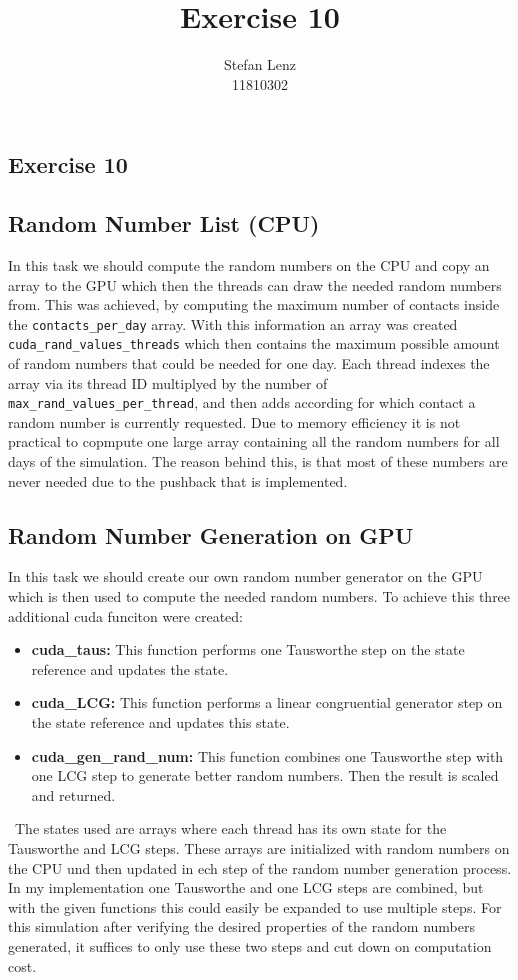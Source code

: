 \documentclass[12pt,a4paper]{article}
\title{Exercise 10}
\author{Stefan Lenz\\11810302}
\date{}
\begin{document}
\begin{center}
  \section*{Exercise 10}
\end{center}
\subsection*{Random Number List (CPU)}
In this task we should compute the random numbers on the CPU and copy an array to the GPU which then the threads can draw the needed random  numbers from. This was achieved, by computing the maximum number of contacts inside the \lstinline|contacts_per_day| array. With this information an array was created \lstinline|cuda_rand_values_threads| which then contains the maximum possible amount of random numbers that could be needed for one day. Each thread indexes the array via its thread ID multiplyed by the number of \lstinline|max_rand_values_per_thread|, and then adds according for which contact a random number is currently requested. Due to memory efficiency it is not practical to copmpute one large array containing all the random numbers for all days of the simulation. The reason behind this, is that most of these numbers are never needed due to the pushback that is implemented.
\subsection*{Random Number Generation on GPU}
In this task we should create our own random number generator on the GPU which is then used to compute the needed random numbers. To achieve this three additional cuda funciton were created:
\begin{itemize}
  \item \textbf{cuda\_taus: } This function performs one Tausworthe step on the state reference and updates the state.
  \item \textbf{cuda\_LCG: } This function performs a linear congruential generator step on the state reference and updates this state.
  \item \textbf{cuda\_gen\_rand\_num: } This function combines one Tausworthe step with one LCG step to generate better random numbers. Then the result is scaled and returned.
\end{itemize}\
The states used are arrays where each thread has its own state for the Tausworthe and LCG steps. These arrays are initialized with random numbers on the CPU und then updated in ech step of the random number generation process. In my implementation one Tausworthe and one LCG steps are combined, but with the given functions this could easily be expanded to use multiple steps. For this simulation after verifying the desired properties of the random numbers generated, it suffices to only use these two steps and cut down on computation cost. 
\end{document}
